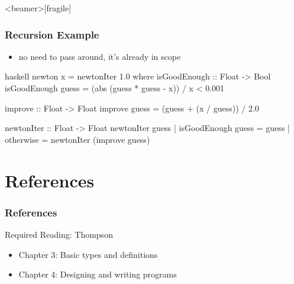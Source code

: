 \documentclass[dvipsnames]{beamer}
\theoremstyle{plain}
\begin{document}
\begin{frame}<beamer>[fragile]
  \frametitle{Recursion Example}

  \begin{exampleblock}{}
    \begin{itemize}
      \item no need to pass  around, it's already in scope
    \end{itemize}

    \pause
    \smallskip
    \begin{pygments}{haskell}
newton x = newtonIter 1.0
  where
    isGoodEnough :: Float -> Bool
    isGoodEnough guess =
        (abs (guess * guess - x)) / x < 0.001

    improve :: Float -> Float
    improve guess = (guess + (x / guess)) / 2.0

    newtonIter :: Float -> Float
    newtonIter guess
      | isGoodEnough guess = guess
      | otherwise          = newtonIter (improve guess)
    \end{pygments}
  \end{exampleblock}
\end{frame}

\section*{References}

\begin{frame}
  \frametitle{References}

  \begin{block}{Required Reading: Thompson}
    \begin{itemize}
      \item Chapter 3: \alert{Basic types and definitions}
      \item Chapter 4: \alert{Designing and writing programs}
    \end{itemize}
  \end{block}
\end{frame}
\end{document}
